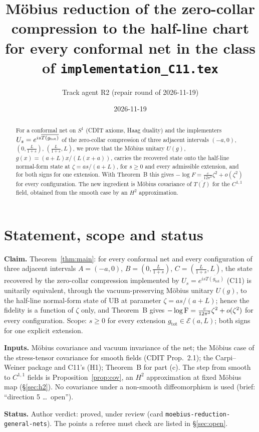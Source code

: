 \documentclass[11pt]{article}
\title{M\"obius reduction of the zero-collar compression to the half-line chart\\[2pt]
\large for every conformal net in the class of \texttt{implementation\_C11.tex}}
\author{Track agent R2 (repair round of 2026-11-19)}
\date{2026-11-19}
\newcommand{\gtot}{g_{\mathrm{tot}}}
\begin{document}
\maketitle
\begin{abstract}\noindent
For a conformal net on $S^1$ (CDIT axioms, Haag duality) and the implementers $U_s=e^{is\overline{T(g_{\rm tot})}}$ of the zero-collar compression of three adjacent intervals $(-a,0)$, $(0,\frac L{1+s})$, $(\frac L{1+s},L)$, we prove that the M\"obius unitary $U(g)$, $g(x)=(a+L)x/(L(x+a))$, carries the recovered state onto the half-line normal-form state at $\zeta=as/(a+L)$, for $s\ge0$ and every admissible extension, and for both signs for one extension.  With Theorem~B this gives $-\log F=\frac c{12\pi^2}\zeta^2+o(\zeta^2)$ for every configuration.  The new ingredient is M\"obius covariance of $\overline{T(f)}$ for the $C^{1,1}$ field, obtained from the smooth case by an $H^2$ approximation.
\end{abstract}
\tableofcontents

\section{Statement, scope and status}\label{sec:status}
\textbf{Claim.}  Theorem~\ref{thm:main}: for every conformal net and every configuration of three adjacent intervals
$A=(-a,0)$, $B=(0,\frac L{1+s})$, $C=(\frac L{1+s},L)$, the state recovered by the zero-collar compression implemented by
$U_s=e^{is\overline{T(\gtot)}}$ (C11) is unitarily equivalent, through the vacuum-preserving Möbius unitary $U(g)$, to
the half-line normal-form state of UB at parameter $\zeta=as/(a+L)$; hence the fidelity is a function of $\zeta$ only,
and Theorem~B gives $-\log\operatorname{F}=\frac c{12\pi^2}\zeta^2+o(\zeta^2)$ for every configuration.  Scope: $s\ge0$ for every
extension $\gtot\in\mathcal E(a,L)$; both signs for one explicit extension.

\textbf{Inputs.}  Möbius covariance and vacuum invariance of the net; the Möbius case of the stress-tensor covariance
for smooth fields (CDIT Prop.~2.1); the Carpi--Weiner package and C11's (H1); Theorem~B for part (c).  The step from
smooth to $C^{1,1}$ fields is Proposition~\ref{prop:cov}, an $H^2$ approximation at fixed Möbius map
(\S\ref{sec:h2}).  No covariance under a non-smooth diffeomorphism is used (brief: ``direction 5 \dots\ open'').

\textbf{Status.}  Author verdict: proved, under review (card \texttt{moebius-reduction-general-nets}).  The points a
referee must check are listed in \S\ref{sec:open}.
\end{document}

